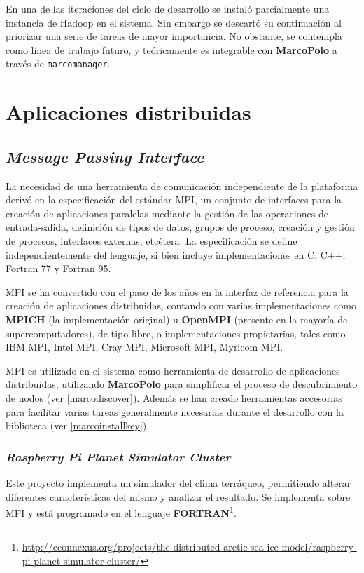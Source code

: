 En una de las iteraciones del ciclo de desarrollo se instaló parcialmente una instancia de Hadoop en el sistema. Sin embargo se descartó su continuación al priorizar una serie de tareas de mayor importancia. No obstante, se contempla como línea de trabajo futuro, y teóricamente es integrable con \textbf{MarcoPolo} a través de \texttt{marcomanager}.

\section{Aplicaciones distribuidas}

\subsection{\textit{Message Passing Interface}}

La necesidad de una herramienta de comunicación independiente de la plataforma derivó en la especificación del estándar MPI\cite{MPISpec}, un conjunto de interfaces para la creación de aplicaciones paralelas mediante la gestión de las operaciones de entrada-salida, definición de tipos de datos, grupos de proceso, creación y gestión de procesos, interfaces externas, etcétera. La especificación se define independientemente del lenguaje, si bien incluye implementaciones en C, C++, Fortran 77 y Fortran 95.

MPI se ha convertido con el paso de los años en la interfaz de referencia para la creación de aplicaciones distribuidas, contando con varias implementaciones como \textbf{MPICH} (la implementación original) u \textbf{OpenMPI} (presente en la mayoría de supercomputadores), de tipo libre, o implementaciones propietarias, tales como IBM MPI, Intel MPI, Cray MPI, Microsoft MPI, Myricom MPI.

MPI es utilizado en el sistema como herramienta de desarrollo de aplicaciones distribuidas, utilizando \textbf{MarcoPolo} para simplificar el proceso de descubrimiento de nodos (ver \ref{marcodiscover}). Además se han creado herramientas accesorias para facilitar varias tareas generalmente necesarias durante el desarrollo con la biblioteca (ver \ref{marcoinstallkey}).

\subsubsection{\textit{Raspberry Pi Planet Simulator Cluster}}

Este proyecto implementa un simulador del clima terráqueo, permitiendo alterar diferentes características del mismo y analizar el resultado. Se implementa sobre MPI y está programado en el lenguaje \textbf{FORTRAN}\footnote{\href{http://econnexus.org/projects/the-distributed-arctic-sea-ice-model/raspberry-pi-planet-simulator-cluster/}{http://econnexus.org/projects/the-distributed-arctic-sea-ice-model/raspberry-pi-planet-simulator-cluster/}}.

